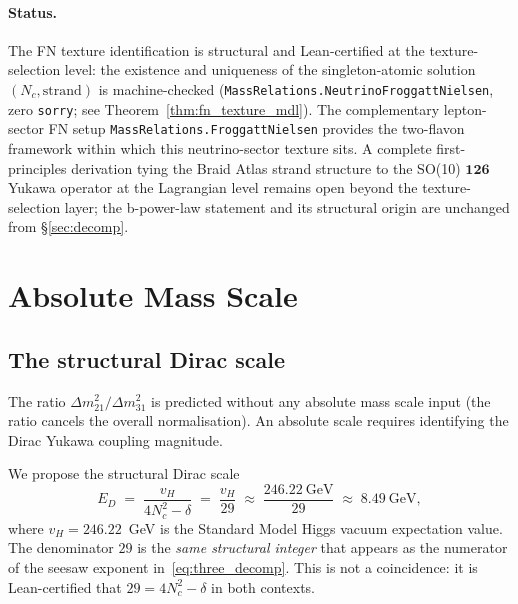 \documentclass[12pt,a4paper]{article}
\theoremstyle{definition}
\theoremstyle{remark}
\begin{document}
\paragraph{Status.}
The FN texture identification is structural and Lean-certified at the
texture-selection level: the existence and uniqueness of the singleton-atomic
solution $(N_c, \mathrm{strand})$ is machine-checked
(\texttt{MassRelations.NeutrinoFroggattNielsen}, zero \texttt{sorry}; see
Theorem~\ref{thm:fn_texture_mdl}).
The complementary lepton-sector FN setup
\texttt{MassRelations.FroggattNielsen} provides the two-flavon framework
within which this neutrino-sector texture sits.
A complete first-principles derivation tying the Braid Atlas strand
structure to the SO(10) $\mathbf{126}$ Yukawa operator at the Lagrangian
level remains open beyond the texture-selection layer; the
b-power-law statement and its structural origin are unchanged from
\S\ref{sec:decomp}.

\section{Absolute Mass Scale}
\label{sec:scale}

\subsection{The structural Dirac scale}
\label{subsec:dirac_scale}

The ratio $\Delta m^2_{21}/\Delta m^2_{31}$ is predicted without any
absolute mass scale input (the ratio cancels the overall normalisation).
An absolute scale requires identifying the Dirac Yukawa coupling magnitude.

We propose the structural Dirac scale
\begin{equation}
  E_D \;=\; \frac{v_H}{4N_c^2 - \delta} \;=\; \frac{v_H}{29}
  \;\approx\; \frac{246.22~\text{GeV}}{29} \;\approx\; 8.49~\text{GeV},
  \label{eq:dirac_scale}
\end{equation}
where $v_H = 246.22$~GeV is the Standard Model Higgs vacuum expectation value.
The denominator $29$ is the \emph{same structural integer} that appears
as the numerator of the seesaw exponent in~\eqref{eq:three_decomp}.
This is not a coincidence: it is Lean-certified that $29 = 4N_c^2 - \delta$
in both contexts.
\end{document}
